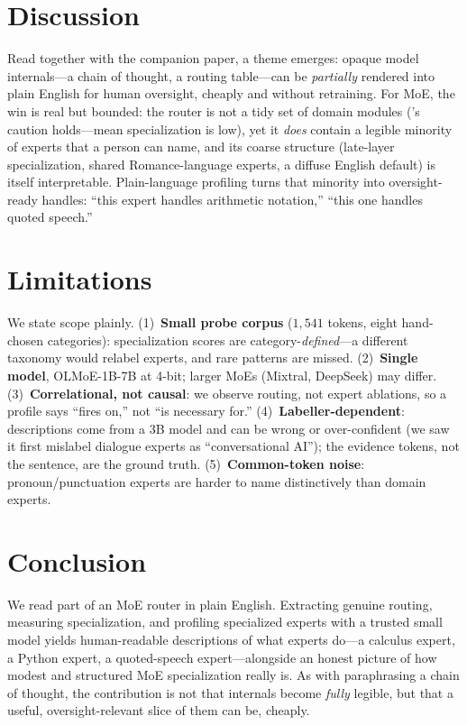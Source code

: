 \documentclass{article}
\begin{document}
\section{Discussion}
Read together with the companion paper, a theme emerges: opaque model internals---a
chain of thought, a routing table---can be \emph{partially} rendered into plain
English for human oversight, cheaply and without retraining. For MoE, the win is
real but bounded: the router is not a tidy set of domain modules
(\citealp{jiang2024mixtral}'s caution holds---mean specialization is low), yet it
\emph{does} contain a legible minority of experts that a person can name, and its
coarse structure (late-layer specialization, shared Romance-language experts, a
diffuse English default) is itself interpretable. Plain-language profiling turns
that minority into oversight-ready handles: ``this expert handles arithmetic
notation,'' ``this one handles quoted speech.''

\section{Limitations}\label{sec:lim}
We state scope plainly. (1)~\textbf{Small probe corpus} ($1{,}541$ tokens, eight
hand-chosen categories): specialization scores are category-\emph{defined}---a
different taxonomy would relabel experts, and rare patterns are missed.
(2)~\textbf{Single model}, OLMoE-1B-7B at 4-bit; larger MoEs (Mixtral, DeepSeek)
may differ. (3)~\textbf{Correlational, not causal}: we observe routing, not
expert ablations, so a profile says ``fires on,'' not ``is necessary for.''
(4)~\textbf{Labeller-dependent}: descriptions come from a 3B model and can be wrong
or over-confident (we saw it first mislabel dialogue experts as ``conversational
AI''); the evidence tokens, not the sentence, are the ground truth.
(5)~\textbf{Common-token noise}: pronoun/punctuation experts are harder to name
distinctively than domain experts.

\section{Conclusion}
We read part of an MoE router in plain English. Extracting genuine routing,
measuring specialization, and profiling specialized experts with a trusted small
model yields human-readable descriptions of what experts do---a calculus expert, a
Python expert, a quoted-speech expert---alongside an honest picture of how modest
and structured MoE specialization really is. As with paraphrasing a chain of
thought, the contribution is not that internals become \emph{fully} legible, but
that a useful, oversight-relevant slice of them can be, cheaply.
\end{document}

